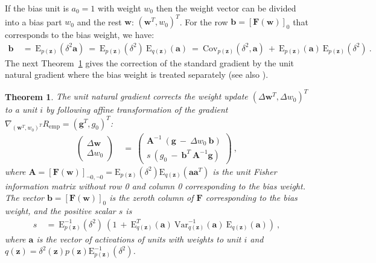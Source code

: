 \documentclass{article}
\newtheorem{theorem}{Theorem}
\newcommand\Ba{\bm{a}}
\newcommand\Bb{\bm{b}}
\newcommand\Bg{\bm{g}}
\newcommand\Bw{\bm{w}}
\newcommand\Bz{\bm{z}}
\newcommand\BA{\bm{A}}
\newcommand\BF{\bm{F}}
\newcommand\EXP{\mathbf{\mathrm{E}}}
\newcommand\VAR{\mathbf{\mathrm{Var}}}
\newcommand\COV{\mathbf{\mathrm{Cov}}}
\begin{document}
If the bias unit is $a_0=1$ with weight $w_0$
then the weight vector can be divided
into a bias part $w_0$ and the rest $\Bw$: $(\Bw^T,w_0)^T$.
For the row $\Bb = \left[\BF(\Bw)\right]_{0}$
that corresponds to the bias weight, we have:
\begin{align}
\label{eq:b}
\Bb \ &= \ \EXP_{p(\Bz)} (\delta^2 \Ba )
\ = \ \EXP_{p(\Bz)} (\delta^2 ) \ \EXP_{q(\Bz)}
(\Ba) \ = \  \COV_{p(\Bz)} ( \delta^2 , \Ba ) \ + \
\EXP_{p(\Bz)} (\Ba) \ \EXP_{p(\Bz)} ( \delta^2 )
\ .
\end{align}
The next Theorem~\ref{th:th1} gives the correction of the standard
gradient by the unit natural gradient where
the bias weight is treated separately (see also \citet{Yang:98}).
\begin{theorem}
\label{th:th1}
The unit natural gradient corrects the weight update
$(\Delta \Bw^T , \Delta w_0)^T$ to a unit $i$ by
following affine transformation of
the gradient  $\nabla_{(\Bw^T,w_0)^T}  R_{\mathrm{emp}} =(\Bg^T , g_0)^T$:
\begin{align}
\begin{pmatrix}
\Delta \Bw \\
\Delta w_0
\end{pmatrix}
\ &= \
\begin{pmatrix}
\BA^{-1} \ \left( \Bg \ - \ \Delta w_0 \ \Bb \right) \\
s \ \left( g_0 \ - \ \Bb^T \ \BA^{-1} \Bg \right)
\end{pmatrix} \ ,
\end{align}
where $\BA= \left[\BF(\Bw)\right]_{\neg 0,\neg 0} =
\EXP_{p(\Bz)}( \delta^2 )  \EXP_{q(\Bz)}(\Ba \Ba^T)$
is the unit Fisher information matrix without row 0 and column 0
corresponding to the bias weight.
The vector $\Bb=\left[\BF(\Bw)\right]_{0}$ is the zeroth column of
$\BF$ corresponding to the bias weight,
and the positive scalar $s$ is
\begin{align}
s \ &= \     \EXP_{p(\Bz)}^{-1} ( \delta^2 ) \ \left( 1 \ + \
\EXP_{q(\Bz)}^T(\Ba)  \ \VAR_{q(\Bz)}^{-1} (\Ba) \ \EXP_{q(\Bz)} (\Ba) \right) \ ,
\end{align}
where $\Ba$ is the vector of activations of units with weights to unit $i$ and
$q(\Bz) =  \delta^2(\Bz) p(\Bz)
\EXP_{p(\Bz)}^{-1} (\delta^2 )$.
\end{theorem}
\end{document}
